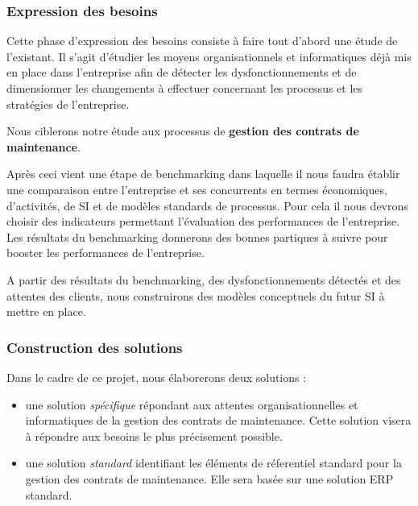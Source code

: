 \subsubsection*{Expression des besoins}


Cette phase d'expression des besoins consiste \`a faire tout d'abord une \'etude de l'existant.
Il s'agit d'\'etudier les moyens organisationnels et informatiques d\'ej\`a mis en place dans l'entreprise afin de détecter les dysfonctionnements et de dimensionner les changements \`a effectuer concernant les processus et les strat\'egies de l'entreprise.

Nous ciblerons notre \'etude aux processus de \textbf{gestion des contrats de maintenance}.

Apr\`es ceci vient une \'etape de benchmarking dans laquelle il nous faudra \'etablir une comparaison entre l'entreprise et ses concurrents en termes \'economiques, d'activit\'es, de SI et de mod\`eles standards de processus.
Pour cela il nous devrons choisir des indicateurs permettant l'\'evaluation des performances de l'entreprise. Les r\'esultats du benchmarking donnerons des bonnes partiques \`a suivre pour booster les performances de l'entreprise.

A partir des résultats du benchmarking, des dysfonctionnements d\'etect\'es et des  attentes des clients, nous construirons des mod\`eles conceptuels du futur SI \`a mettre en place.


\subsubsection*{Construction des solutions}

Dans le cadre de ce projet, nous \'elaborerons deux solutions :

\begin{itemize}
 \item une solution \textit{sp\'ecifique} r\'epondant aux attentes organisationnelles et informatiques de la gestion des contrats de maintenance. Cette solution visera \`a r\'epondre aux besoins le plus pr\'ecisement possible.
 \item une solution \textit{standard} identifiant les \'el\'ements de r\'eferentiel standard pour la gestion des contrats de maintenance. Elle sera bas\'ee sur une solution ERP standard.
\end{itemize}

